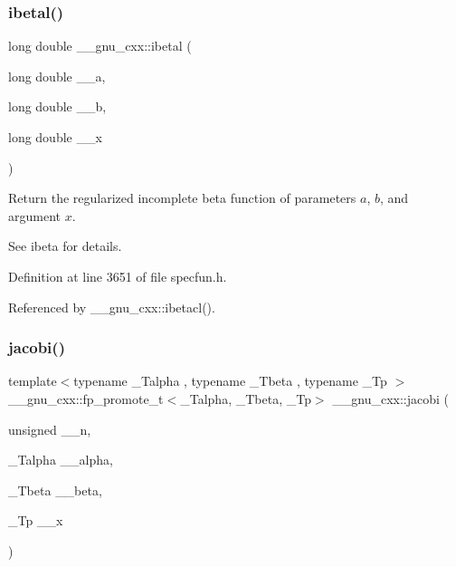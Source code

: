 \subsubsection{\texorpdfstring{ibetal()}{ibetal()}}
{\footnotesize\ttfamily long double \+\_\+\+\_\+gnu\+\_\+cxx\+::ibetal (\begin{DoxyParamCaption}\item[{long double}]{\+\_\+\+\_\+a,  }\item[{long double}]{\+\_\+\+\_\+b,  }\item[{long double}]{\+\_\+\+\_\+x }\end{DoxyParamCaption})\hspace{0.3cm}{\ttfamily [inline]}}

Return the regularized incomplete beta function of parameters $ a $, $ b $, and argument $ x $.

See ibeta for details. 

Definition at line 3651 of file specfun.\+h.



Referenced by \+\_\+\+\_\+gnu\+\_\+cxx\+::ibetacl().

\mbox{\label{group__gnu__math__spec__func_gad54f6601748324d268532138eb38ca33}} 
\subsubsection{\texorpdfstring{jacobi()}{jacobi()}}
{\footnotesize\ttfamily template$<$typename \+\_\+\+Talpha , typename \+\_\+\+Tbeta , typename \+\_\+\+Tp $>$ \\
\+\_\+\+\_\+gnu\+\_\+cxx\+::fp\+\_\+promote\+\_\+t$<$\+\_\+\+Talpha, \+\_\+\+Tbeta, \+\_\+\+Tp$>$ \+\_\+\+\_\+gnu\+\_\+cxx\+::jacobi (\begin{DoxyParamCaption}\item[{unsigned}]{\+\_\+\+\_\+n,  }\item[{\+\_\+\+Talpha}]{\+\_\+\+\_\+alpha,  }\item[{\+\_\+\+Tbeta}]{\+\_\+\+\_\+beta,  }\item[{\+\_\+\+Tp}]{\+\_\+\+\_\+x }\end{DoxyParamCaption})\hspace{0.3cm}{\ttfamily [inline]}}

